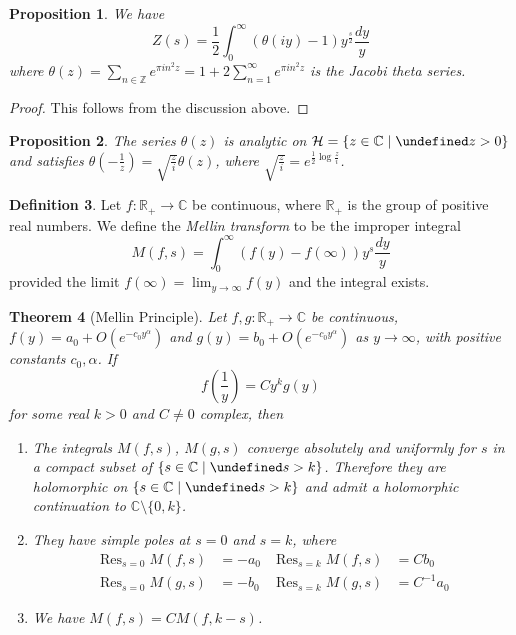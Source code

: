 \documentclass[11pt]{article}
\theoremstyle{definition}
\newtheorem{definition}{Definition}[section]
\theoremstyle{plain}
\newtheorem{theorem}[definition]{Theorem}
\newtheorem{proposition}[definition]{Proposition}
\theoremstyle{remark}
\let\Re\undefined
\let\Im\undefined
\DeclareMathOperator{\Re}{Re}
\DeclareMathOperator{\Im}{Im}
\DeclareMathOperator{\Res}{Res}
\newcommand{\ZZ}{\mathbb{Z}}
\newcommand{\RR}{\mathbb{R}}
\newcommand{\CC}{\mathbb{C}}
\newcommand{\cH}{\mathcal{H}}
\begin{document}
\begin{proposition}\label{prop:5_11}
    We have
    \begin{equation*}
        Z(s) = \frac{1}{2} \int_0^\infty (\theta(iy)-1) y^{\frac{s}{2}} \frac{dy}{y}
    \end{equation*}
    where $\theta(z) = \sum_{n \in \ZZ} e^{\pi i n^2 z} = 1 + 2\sum_{n=1}^\infty e^{\pi i n^2 z}$ is the Jacobi theta series.
\end{proposition}
\begin{proof}
    This follows from the discussion above.
\end{proof}

\begin{proposition}\label{prop:5_12}
    The series $\theta(z)$ is analytic on $\cH = \{z \in \CC \mid \Im z > 0\}$ and satisfies $\theta(-\frac{1}{z}) = \sqrt{\frac{z}{i}} \theta(z)$, where $\sqrt{\frac{z}{i}} = e^{\frac{1}{2} \log \frac{z}{i}}$.
\end{proposition}

\begin{definition}\label{def:5_13}
    Let $f : \RR_+ \to \CC$ be continuous, where $\RR_+$ is the group of positive real numbers. We define the \emph{Mellin transform} to be the improper integral
    \begin{equation*}
        M(f, s) = \int_0^\infty (f(y) - f(\infty)) y^s \frac{dy}{y}
    \end{equation*}
    provided the limit $f(\infty) = \lim_{y \to \infty} f(y)$ and the integral exists.
\end{definition}

\begin{theorem}[Mellin Principle]\label{thm:5_14}
    Let $f, g : \RR_+ \to \CC$ be continuous, $f(y) = a_0 + O(e^{-c_0 y^\alpha})$ and $g(y) = b_0 + O(e^{-c_0 y^\alpha})$ as $y \to \infty$, with positive constants $c_0, \alpha$. If
    \begin{equation*}
        f\left(\frac{1}{y}\right) = C y^k g(y)
    \end{equation*}
    for some real $k > 0$ and $C \neq 0$ complex, then
    \begin{enumerate}
        \item The integrals $M(f,s)$, $M(g,s)$ converge absolutely and uniformly for $s$ in a compact subset of $\{s \in \CC \mid \Re s > k\}$. Therefore they are holomorphic on $\{s \in \CC \mid \Re s > k\}$ and admit a holomorphic continuation to $\CC \setminus \{0, k\}$.

        \item They have simple poles at $s=0$ and $s=k$, where
            \begin{align*}
                \Res_{s=0} M(f,s) &= -a_0 & \Res_{s=k} M(f,s) &= C b_0\\
                \Res_{s=0} M(g,s) &= -b_0 & \Res_{s=k} M(g,s) &= C^{-1} a_0
            \end{align*}

        \item We have $M(f,s) = C M(f,k-s)$.
    \end{enumerate}
\end{theorem}
\end{document}
